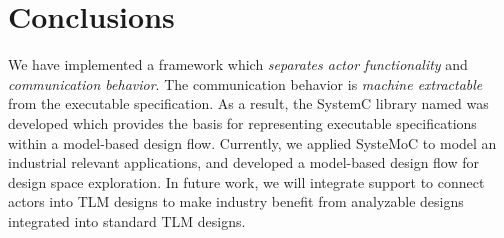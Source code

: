 \section{Conclusions}\label{sec:conclusions}

We have implemented a framework which \emph{separates actor functionality} and \emph{communication behavior}.
The communication behavior is \emph{machine extractable} from the executable specification.
As a result, the SystemC library named \SysteMoC{} was developed which provides the basis for representing executable specifications within a model-based design flow.
Currently, we applied SysteMoC to model an industrial relevant applications, and developed a model-based design flow for design space exploration.
In future work, we will integrate support to connect \SysteMoC{} actors into TLM designs to make industry benefit from analyzable \SysteMoC{} designs integrated into standard TLM designs.


